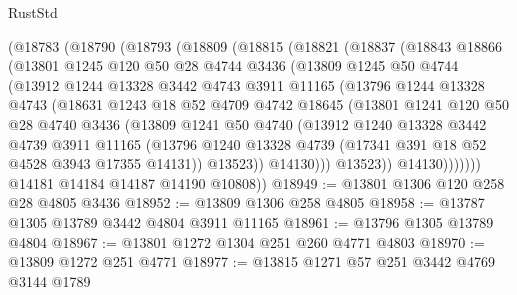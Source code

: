 \begin{lexlean}{RustStd}
\begin{coremodule}
    (@18783
      (@18790
        (@18793
          (@18809
            (@18815
              (@18821
                (@18837
                  (@18843
                    @18866
                    (@13801
                      @1245
                      @120
                      @50
                      @28
                      @4744
                      @3436
                      (@13809
                        @1245
                        @50
                        @4744
                        (@13912
                          @1244
                          @13328
                          @3442
                          @4743
                          @3911
                          @11165
                          (@13796
                            @1244
                            @13328
                            @4743
                            (@18631
                              @1243
                              @18
                              @52
                              @4709
                              @4742
                              @18645
                              (@13801
                                @1241
                                @120
                                @50
                                @28
                                @4740
                                @3436
                                (@13809
                                  @1241
                                  @50
                                  @4740
                                  (@13912
                                    @1240
                                    @13328
                                    @3442
                                    @4739
                                    @3911
                                    @11165
                                    (@13796
                                      @1240
                                      @13328
                                      @4739
                                      (@17341 @391 @18 @52 @4528 @3943 @17355 @14131))
                                    @13523))
                                @14130)))
                          @13523))
                      @14130)))))))
        @14181
        @14184
        @14187
        @14190
        @10808))
@18949 := @13801 @1306 @120 @258 @28 @4805 @3436
@18952 := @13809 @1306 @258 @4805
@18958 := @13787 @1305 @13789 @3442 @4804 @3911 @11165
@18961 := @13796 @1305 @13789 @4804
@18967 := @13801 @1272 @1304 @251 @260 @4771 @4803
@18970 := @13809 @1272 @251 @4771
@18977 := @13815 @1271 @57 @251 @3442 @4769 @3144 @1789

\end{coremodule}
\end{lexlean}

